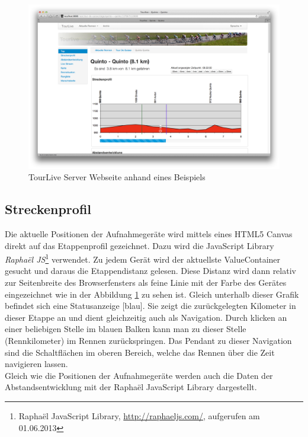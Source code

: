 \begin{figure}[H]
	\centering
	\includegraphics[width=130mm]{images/tourliveweb/tourlivewebansicht.png}
	\caption{TourLive Server Webseite anhand eines Beispiels}
	\label{fig:tourlivewebansicht}
\end{figure}

\subsection{Streckenprofil}
Die aktuelle Positionen der Aufnahmegeräte wird mittels eines HTML5 Canvas direkt auf das Etappenprofil gezeichnet. Dazu wird die JavaScript Library \textit{Raphaël JS}\footnote{Raphaël JavaScript Library, \url{http://raphaeljs.com/}, aufgerufen am 01.06.2013} verwendet. Zu jedem Gerät wird der aktuellste ValueContainer gesucht und daraus die Etappendistanz gelesen. Diese Distanz wird dann relativ zur Seitenbreite des Browserfensters als feine Linie mit der Farbe des Gerätes eingezeichnet wie in der Abbildung \ref{fig:tourlivewebansicht} zu sehen ist. Gleich unterhalb dieser Grafik befindet sich eine Statusanzeige [blau]. Sie zeigt die zurückgelegten Kilometer in dieser Etappe an und dient gleichzeitig auch als Navigation. Durch klicken an einer beliebigen Stelle im blauen Balken kann man zu dieser Stelle (Rennkilometer) im Rennen zurückspringen. Das Pendant zu dieser Navigation sind die Schaltflächen im oberen Bereich, welche das Rennen über die Zeit navigieren lassen.
\\

Gleich wie die Positionen der Aufnahmegeräte werden auch die Daten der Abstandsentwicklung mit der Raphaël JavaScript Library dargestellt.

